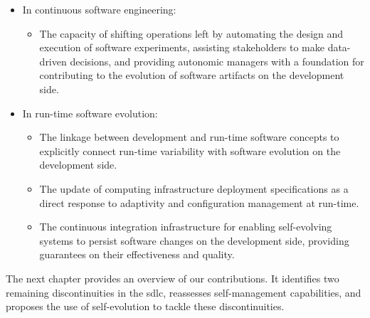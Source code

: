 \begin{itemize}[noitemsep]
	\item In continuous software engineering:
	\begin{itemize}[noitemsep]
		\item The capacity of shifting operations left by automating the design and execution of software experiments, assisting stakeholders to make data-driven decisions, and providing autonomic managers with a foundation for contributing to the evolution of software artifacts on the development side.
	\end{itemize}
	\item In run-time software evolution:
	\begin{itemize}[noitemsep]
		\item The linkage between development and run-time software concepts to explicitly connect run-time variability with software evolution on the development side.
		\item The update of computing infrastructure deployment specifications as a direct response to adaptivity and configuration management at run-time.
		\item The continuous integration infrastructure for enabling self-evolving systems to persist software changes on the development side, providing guarantees on their effectiveness and quality.
	\end{itemize}
\end{itemize}

The next chapter provides an overview of our contributions. It identifies two remaining discontinuities in the \gls{sdlc}, reassesses self-management capabilities, and proposes the use of self-evolution to tackle these discontinuities.
